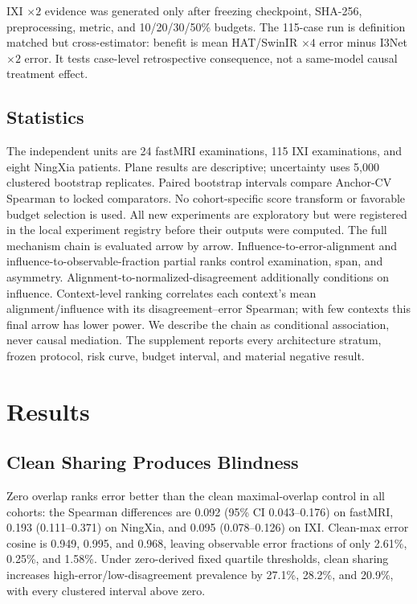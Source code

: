 \documentclass[10pt,twocolumn,letterpaper]{article}
\begin{document}
IXI $\times2$ evidence was generated only after freezing checkpoint, SHA-256, preprocessing, metric, and 10/20/30/50\% budgets. The 115-case run is definition matched but cross-estimator: benefit is mean HAT/SwinIR $\times4$ error minus I3Net $\times2$ error. It tests case-level retrospective consequence, not a same-model causal treatment effect.

\subsection{Statistics}
The independent units are 24 fastMRI examinations, 115 IXI examinations, and eight NingXia patients. Plane results are descriptive; uncertainty uses 5,000 clustered bootstrap replicates. Paired bootstrap intervals compare Anchor-CV Spearman to locked comparators. No cohort-specific score transform or favorable budget selection is used. All new experiments are exploratory but were registered in the local experiment registry before their outputs were computed.
The full mechanism chain is evaluated arrow by arrow. Influence-to-error-alignment and influence-to-observable-fraction partial ranks control examination, span, and asymmetry. Alignment-to-normalized-disagreement additionally conditions on influence. Context-level ranking correlates each context's mean alignment/influence with its disagreement--error Spearman; with few contexts this final arrow has lower power. We describe the chain as conditional association, never causal mediation. The supplement reports every architecture stratum, frozen protocol, risk curve, budget interval, and material negative result.

\section{Results}
\subsection{Clean Sharing Produces Blindness}
Zero overlap ranks error better than the clean maximal-overlap control in all cohorts: the Spearman differences are 0.092 (95\% CI 0.043--0.176) on fastMRI, 0.193 (0.111--0.371) on NingXia, and 0.095 (0.078--0.126) on IXI. Clean-max error cosine is 0.949, 0.995, and 0.968, leaving observable error fractions of only 2.61\%, 0.25\%, and 1.58\%. Under zero-derived fixed quartile thresholds, clean sharing increases high-error/low-disagreement prevalence by 27.1\%, 28.2\%, and 20.9\%, with every clustered interval above zero.
\end{document}
